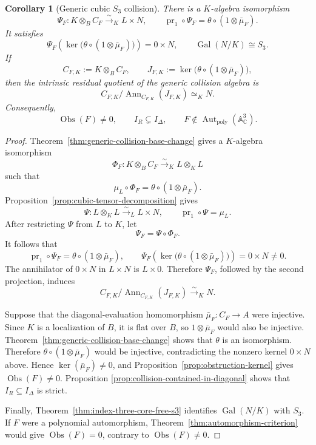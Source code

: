 \documentclass[11pt]{article}
\newtheorem{corollary}[theorem]{Corollary}
\theoremstyle{remark}
\theoremstyle{definition}
\DeclareMathOperator{\Gal}{Gal}
\DeclareMathOperator{\Aut}{Aut}
\DeclareMathOperator{\Ann}{Ann}
\newcommand{\A}{\mathbb A}
\newcommand{\C}{\mathbb C}
\newcommand{\Obs}{\operatorname{Obs}}
\begin{document}
\begin{corollary}[Generic cubic \(S_3\) collision]
\label{cor:cubic-s3-collision}
There is a \(K\)-algebra isomorphism
\[
  \Psi_F\colon
  K\otimes_BC_F\xrightarrow{\sim}_K L\times N,
  \qquad
  \operatorname{pr}_1\circ\Psi_F
  =
  \theta\circ(1\otimes\bar\mu_F).
\]
It satisfies
\[
  \Psi_F\!\left(
    \ker\bigl(\theta\circ(1\otimes\bar\mu_F)\bigr)
  \right)
  =
  0\times N,
  \qquad
  \Gal(N/K)\cong S_3.
\]
If
\[
  C_{F,K}:=K\otimes_BC_F,
  \qquad
  J_{F,K}:=\ker\bigl(\theta\circ(1\otimes\bar\mu_F)\bigr),
\]
then the intrinsic residual quotient of the generic collision algebra is
\[
  C_{F,K}/\Ann_{C_{F,K}}(J_{F,K})\simeq_K N.
\]
Consequently,
\[
  \Obs(F)\neq0,
  \qquad
  I_R\subsetneq I_\Delta,
  \qquad
  F\notin\Aut_{\mathrm{poly}}(\A^3_{\C}).
\]
\end{corollary}

\begin{proof}
Theorem~\ref{thm:generic-collision-base-change} gives a \(K\)-algebra
isomorphism
\[
  \Phi_F\colon K\otimes_BC_F\xrightarrow{\sim}_K L\otimes_KL
\]
such that
\[
  \mu_L\circ\Phi_F
  =
  \theta\circ(1\otimes\bar\mu_F).
\]
Proposition~\ref{prop:cubic-tensor-decomposition} gives
\[
  \Psi\colon L\otimes_KL\xrightarrow{\sim}_L L\times N,
  \qquad
  \operatorname{pr}_1\circ\Psi=\mu_L.
\]
After restricting \(\Psi\) from \(L\) to \(K\), let
\[
  \Psi_F=\Psi\circ\Phi_F.
\]
It follows that
\[
  \operatorname{pr}_1\circ\Psi_F
  =
  \theta\circ(1\otimes\bar\mu_F),
  \qquad
  \Psi_F\!\left(
    \ker\bigl(\theta\circ(1\otimes\bar\mu_F)\bigr)
  \right)
  =
  0\times N\neq0.
\]
The annihilator of \(0\times N\) in \(L\times N\) is \(L\times0\).
Therefore \(\Psi_F\), followed by the second projection, induces
\[
  C_{F,K}/\Ann_{C_{F,K}}(J_{F,K})\xrightarrow{\sim}_K N.
\]

Suppose that the diagonal-evaluation homomorphism
\(\bar\mu_F\colon C_F\to A\) were injective.  Since \(K\) is a
localization of \(B\), it is flat over
\(B\), so \(1\otimes\bar\mu_F\) would also be injective.
Theorem~\ref{thm:generic-collision-base-change} shows that \(\theta\)
is an isomorphism.  Therefore
\(\theta\circ(1\otimes\bar\mu_F)\) would be injective, contradicting
the nonzero kernel \(0\times N\) above.  Hence
\(\ker(\bar\mu_F)\neq0\), and
Proposition~\ref{prop:obstruction-kernel} gives
\(\Obs(F)\neq0\).  Proposition
\ref{prop:collision-contained-in-diagonal} shows that
\(I_R\subseteq I_\Delta\) is strict.

Finally, Theorem~\ref{thm:index-three-core-free-s3} identifies
\(\Gal(N/K)\) with \(S_3\).  If \(F\) were a polynomial automorphism,
Theorem~\ref{thm:automorphism-criterion} would give
\(\Obs(F)=0\), contrary to \(\Obs(F)\neq0\).
\end{proof}
\end{document}

